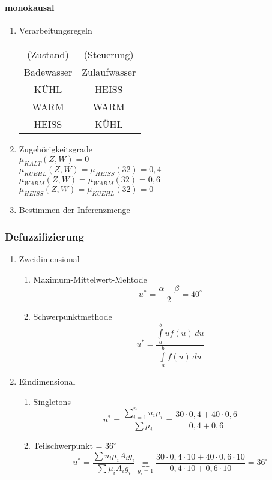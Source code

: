 \documentclass[a4paper]{scrartcl}
\begin{document}
\paragraph{monokausal}
\begin{enumerate}
\item Verarbeitungsregeln\\
\begin{tabular}{c|c}
(Zustand) & (Steuerung)\\
Badewasser & Zulaufwasser\\ \hline
KÜHL & HEISS\\
WARM & WARM\\
HEISS & KÜHL\\
\end{tabular}
\item Zugehörigkeitsgrade\\
$\mu_{KALT}(Z,W) = 0$\\
$\mu_{KUEHL}(Z,W) = \mu_{HEISS} (32) = 0,4$\\
$\mu_{WARM}(Z,W) = \mu_{WARM}(32) = 0,6$\\
$\mu_{HEISS} (Z,W)  = \mu_{KUEHL} (32) = 0$\\
\item Bestimmen der Inferenzmenge
\end{enumerate}
\subsubsection{Defuzzifizierung}
\begin{enumerate}
\item Zweidimensional
	\begin{enumerate}
	\item Maximum-Mittelwert-Mehtode
	\[ u^* = \frac{\alpha + \beta}{2} = 40^\circ \]
	\item Schwerpunktmethode
	\[ u^* = \frac{\int\limits_a^b uf(u) \, du}{\int\limits_a^b f(u) \, du} \]
	\end{enumerate}
\item Eindimensional
	\begin{enumerate}%
	\item Singletons
	\[ u^* = \frac{\sum\limits_{i=1}^{n} u_i \mu_i}{\sum \mu_i} = \frac{30 \cdot 0,4 + 40 \cdot 0,6}{0,4+0,6} \]
	\item Teilschwerpunkt = $36^\circ$
	\[ u^* = \frac{\sum u_i \mu_i A_i g_i}{\sum \mu_i A_i g_i} \underbrace{=}_{g_i = 1} \frac{30 \cdot 0,4 \cdot 10 + 40 \cdot 0,6 \cdot 10}{0,4 \cdot 10 + 0,6 \cdot 10} = 36^\circ \]
	\end{enumerate}
\end{enumerate}
\end{document}
